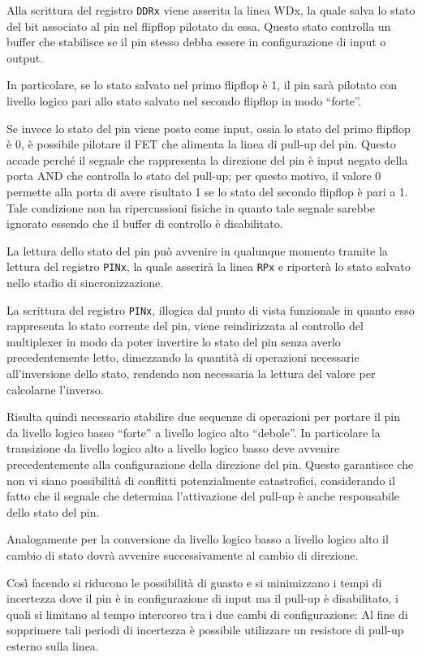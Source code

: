 Alla scrittura del registro \texttt{DDRx} viene asserita la linea WDx, la quale salva lo stato del bit associato al pin nel flipflop pilotato da essa. Questo stato controlla un buffer che stabilisce se il pin stesso debba essere in configurazione di input o output.

In particolare, se lo stato salvato nel primo flipflop è 1, il pin sarà pilotato con livello logico pari allo stato salvato nel secondo flipflop in modo ``forte''.

Se invece lo stato del pin viene posto come input, ossia lo stato del primo flipflop è 0, è possibile pilotare il FET che alimenta la linea di pull-up del pin. Questo accade perché il segnale che rappresenta la direzione del pin è input negato della porta AND che controlla lo stato del pull-up; per questo motivo, il valore 0 permette alla porta di avere risultato 1 se lo stato del secondo flipflop è pari a 1.
Tale condizione non ha ripercussioni fisiche in quanto tale segnale sarebbe ignorato essendo che il buffer di controllo è disabilitato.

La lettura dello stato del pin può avvenire in qualunque momento tramite la lettura del registro \texttt{PINx}, la quale asserirà la linea \texttt{RPx} e riporterà lo stato salvato nello stadio di sincronizzazione.

La scrittura del registro \texttt{PINx}, illogica dal punto di vista funzionale in quanto esso rappresenta lo stato corrente del pin, viene reindirizzata al controllo del multiplexer in modo da poter invertire lo stato del pin senza averlo precedentemente letto, dimezzando la quantità di operazioni necessarie all'inversione dello stato, rendendo non necessaria la lettura del valore per calcolarne l'inverso.

Risulta quindi necessario stabilire due sequenze di operazioni per portare il pin da livello logico basso ``forte'' a livello logico alto ``debole''. In particolare la transizione da livello logico alto a livello logico basso deve avvenire precedentemente alla configurazione della direzione del pin. Questo garantisce che non vi siano possibilità di conflitti potenzialmente catastrofici, considerando il fatto che il segnale che determina l'attivazione del pull-up è anche responsabile dello stato del pin.

Analogamente per la conversione da livello logico basso a livello logico alto il cambio di stato dovrà avvenire successivamente al cambio di direzione.

Così facendo si riducono le possibilità di guasto e si minimizzano i tempi di incertezza dove il pin è in configurazione di input ma il pull-up è disabilitato, i quali si limitano al tempo intercorso tra i due cambi di configurazione: Al fine di sopprimere tali periodi di incertezza è possibile utilizzare un resistore di pull-up esterno sulla linea.

